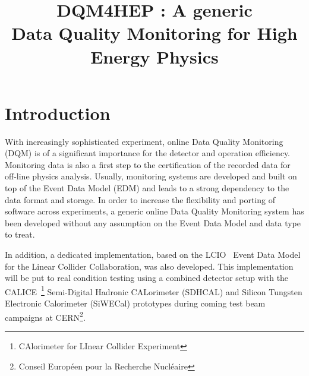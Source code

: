\documentclass[conference]{IEEEtran}
\begin{document}
\title{DQM4HEP : A generic\\Data Quality Monitoring for High Energy Physics}

\author{


\and


\and


}

\maketitle

\IEEEpeerreviewmaketitle

\section{Introduction}

With increasingly sophisticated experiment, online Data Quality Monitoring (DQM) is of a significant importance for the detector and operation efficiency. Monitoring data is also a first step to the certification of the recorded data for off-line physics analysis. Usually, monitoring systems are developed and built on top of the Event Data Model (EDM) and leads to a strong dependency to the data format and storage. In order to increase the flexibility and porting of software across experiments, a generic online Data Quality Monitoring system has been developed without any assumption on the Event Data Model and data type to treat.

In addition, a dedicated implementation, based on the LCIO~\cite{LCIO} Event Data Model for the Linear Collider Collaboration, was also developed. This implementation will be put to real condition testing using a combined detector setup with the CALICE~\footnote{CAlorimeter for LInear Collider Experiment} Semi-Digital Hadronic CALorimeter (SDHCAL) and Silicon Tungsten Electronic Calorimeter (SiWECal) prototypes during coming test beam campaigns at CERN\footnote{Conseil Européen pour la Recherche Nucléaire}.
\end{document}
